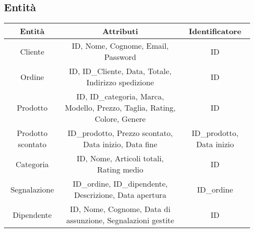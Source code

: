 \subsection{Entità}
\begin{center}
\begin{tabular}{ |c|c|c|} 
\hline
Entità & Attributi & Identificatore \\
\hline
\multirow{4}{6em}{Cliente} & \multirow{4}{8em}{ID, Nome, Cognome, Email, Password} & \multirow{4}{12em}{ID} \\
 &  & \\
 &  & \\
 &  & \\
\hline

\multirow{4}{6em}{Ordine} & \multirow{4}{8em}{ID, ID\_Cliente, Data, Totale, Indirizzo spedizione} & \multirow{4}{12em}{ID} \\
 &  & \\
 &  & \\
 &  & \\
\hline

\multirow{5}{6em}{Prodotto} & \multirow{5}{8em}{ID, ID\_categoria, Marca, Modello, Prezzo, Taglia, Rating, Colore, Genere} & \multirow{5}{12em}{ID} \\
 &  & \\
 &  & \\
 &  & \\
 &  & \\
\hline

\multirow{4}{6em}{Prodotto scontato} & \multirow{4}{8em}{ID\_prodotto, Prezzo scontato, Data inizio, Data fine} & \multirow{4}{12em}{ID\_prodotto, Data inizio} \\
 &  & \\
 &  & \\
 &  & \\
\hline

\multirow{3}{6em}{Categoria} & \multirow{3}{8em}{ID, Nome, Articoli totali, Rating medio} & \multirow{3}{12em}{ID} \\
 &  & \\
 &  & \\ 
\hline

\multirow{5}{6em}{Segnalazione} & \multirow{5}{8em}{ ID\_ordine, ID\_dipendente, Descrizione, Data apertura} & \multirow{5}{12em}{ID\_ordine} \\
 &  & \\
 &  & \\
 &  & \\
 &  & \\
\hline

\multirow{5}{6em}{Dipendente} & \multirow{5}{8em}{ID, Nome, Cognome, Data di assunzione, Segnalazioni gestite} & \multirow{5}{12em}{ID} \\
&  & \\
&  & \\
&  & \\
&  & \\
\hline
\end{tabular}
\end{center}